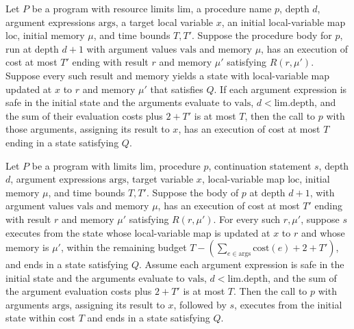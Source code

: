 \begin{theorem}
\label{Light.Ends.callLast}
\leanok
{}
Let $P$ be a program with resource limits $\mathrm{lim}$, a procedure name $p$, depth $d$,
argument expressions $\mathrm{args}$, a target local variable $x$, an initial local-variable
map $\mathrm{loc}$, initial memory $\mu$, and time bounds $T,T\prime$. Suppose the
procedure body for $p$, run at depth $d+1$ with argument values $\mathrm{vals}$ and memory
$\mu$, has an execution of cost at most $T\prime$ ending with result $r$ and memory
$\mu\prime$ satisfying $R(r,\mu\prime)$. Suppose every such result and memory yields
a state with local-variable map updated at $x$ to $r$ and memory $\mu\prime$ that
satisfies $Q$. If each argument expression is safe in the initial state and the arguments
evaluate to $\mathrm{vals}$, $d<\mathrm{lim.depth}$, and the sum of their evaluation
costs plus $2+T\prime$ is at most $T$, then the call to $p$ with those arguments,
assigning its result to $x$, has an execution of cost at most $T$ ending in a state
satisfying $Q$.
\end{theorem}

\begin{theorem}
\label{Light.Ends.callThen}
\leanok
{}
Let $P$ be a program with limits $\mathrm{lim}$, procedure $p$, continuation statement $s$,
depth $d$, argument expressions $\mathrm{args}$, target variable $x$, local-variable map
$\mathrm{loc}$, initial memory $\mu$, and time bounds $T,T\prime$. Suppose the body of
$p$ at depth $d+1$, with argument values $\mathrm{vals}$ and memory $\mu$, has an
execution of cost at most $T\prime$ ending with result $r$ and memory $\mu\prime$
satisfying $R(r,\mu\prime)$. For every such $r,\mu\prime$, suppose $s$ executes from
the state whose local-variable map is updated at $x$ to $r$ and whose memory is
$\mu\prime$, within the remaining budget $T-(\sum_{e\in\mathrm{args}}\mathrm{cost}(e)+2+T\prime)$,
and ends in a state satisfying $Q$. Assume each argument expression is safe in the initial
state and the arguments evaluate to $\mathrm{vals}$, $d<\mathrm{lim.depth}$, and the sum
of the argument evaluation costs plus $2+T\prime$ is at most $T$. Then the call to $p$
with arguments $\mathrm{args}$, assigning its result to $x$, followed by $s$, executes
from the initial state within cost $T$ and ends in a state satisfying $Q$.
\end{theorem}

